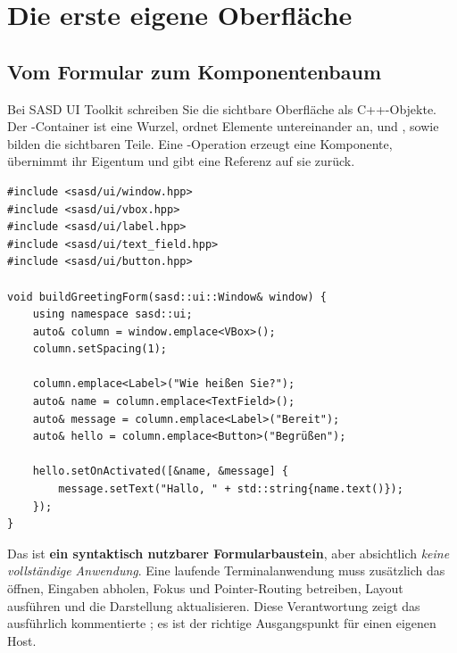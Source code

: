 \chapter{Die erste eigene Oberfläche}\label{chap:first}

\section{Vom Formular zum Komponentenbaum}
Bei SASD UI Toolkit schreiben Sie die sichtbare Oberfläche als
C++-Objekte. Der -Container ist eine Wurzel,
 ordnet Elemente untereinander an, und ,
 sowie  bilden die sichtbaren Teile.
Eine -Operation erzeugt eine Komponente,
übernimmt ihr Eigentum und gibt eine Referenz auf sie zurück.

\begin{lstlisting}[language=SASDCpp,caption={Ein kleiner Formularbaum, bewusst ohne Host/Eventloop}]
#include <sasd/ui/window.hpp>
#include <sasd/ui/vbox.hpp>
#include <sasd/ui/label.hpp>
#include <sasd/ui/text_field.hpp>
#include <sasd/ui/button.hpp>

void buildGreetingForm(sasd::ui::Window& window) {
    using namespace sasd::ui;
    auto& column = window.emplace<VBox>();
    column.setSpacing(1);

    column.emplace<Label>("Wie heißen Sie?");
    auto& name = column.emplace<TextField>();
    auto& message = column.emplace<Label>("Bereit");
    auto& hello = column.emplace<Button>("Begrüßen");

    hello.setOnActivated([&name, &message] {
        message.setText("Hallo, " + std::string{name.text()});
    });
}
\end{lstlisting}

Das ist \textbf{ein syntaktisch nutzbarer Formularbaustein},
aber absichtlich \emph{keine vollständige Anwendung}.
Eine laufende Terminalanwendung muss zusätzlich das
 öffnen, Eingaben abholen,
Fokus und Pointer-Routing betreiben, Layout ausführen
und die Darstellung aktualisieren. Diese Verantwortung
zeigt das ausführlich kommentierte
; es ist der
richtige Ausgangspunkt für einen eigenen Host.

